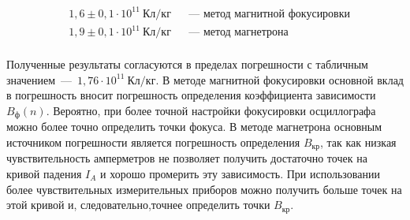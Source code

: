 \documentclass[a4paper, 12pt]{article}
\begin{document}
$$\boxed{\begin{aligned}
&1,6\pm0,1\cdot 10^{11}~Кл/кг && \text{--- метод магнитной фокусировки} \\
&1,9\pm0,1\cdot 10^{11}~Кл/кг && \text{--- метод магнетрона} \\
\end{aligned}}$$

Полученные результаты согласуются в пределах погрешности с табличным значением~---~$1,76 \cdot 10^{11}~Кл/кг$. В методе магнитной фокусировки основной вклад в погрешность вносит погрешность определения коэффициента зависимости $B_ф(n)$. Вероятно, при более точной настройки фокусировки осциллографа можно более точно определить точки фокуса. В методе магнетрона основным источником погрешности является погрешность определения $B_{кр}$, так как низкая чувствительность амперметров не позволяет получить достаточно точек на кривой падения $I_A$ и хорошо промерить эту зависимость. При использовании более чувствительных измерительных приборов можно получить больше точек на этой кривой и, следовательно,точнее определить точки $B_{кр}$.
\end{document}
